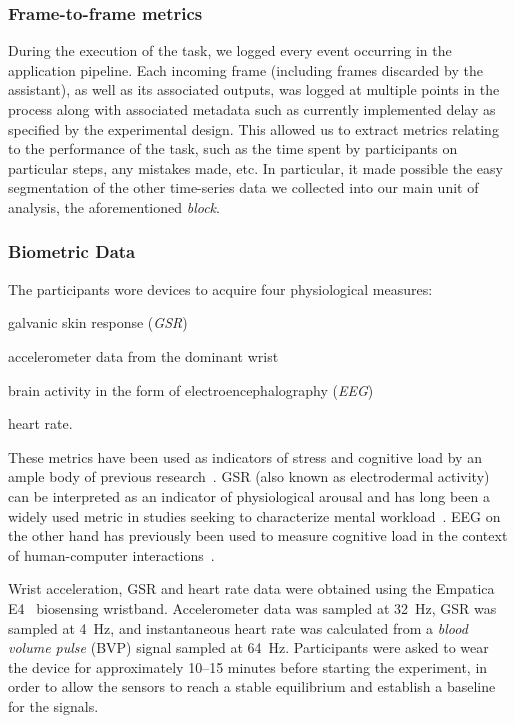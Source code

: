 \subsubsection{Frame-to-frame metrics}
During the execution of the task, we logged every event occurring in the application pipeline.
Each incoming frame (including frames discarded by the assistant), as well as its associated outputs, was logged at multiple points in the process along with associated metadata such as currently implemented delay as specified by the experimental design.
This allowed us to extract metrics relating to the performance of the task, such as the time spent by participants on particular steps, any mistakes made, etc.
In particular, it made possible the easy segmentation of the other time-series data we collected into our main unit of analysis, the aforementioned \emph{block}.

\subsubsection{Biometric Data}
The participants wore devices to acquire four physiological measures:
\begin{enumerate*}[itemjoin={{, }},
                  itemjoin*={{, and }},
                  label={{(\arabic*)}}]
  \item galvanic skin response (\emph{GSR})
  \item accelerometer data from the dominant wrist
  \item brain activity in the form of electroencephalography (\emph{EEG})
  \item heart rate.
\end{enumerate*}

These metrics have been used as indicators of stress and cognitive load by an ample body of previous research~\cite{khawadi2015:usinggsrtrust,kuikkaniemi2010:biofeedback,solovey2014:classifyingdriverworkload}.
GSR (also known as electrodermal activity) can be interpreted as an indicator of physiological arousal and has long been a widely used metric in studies seeking to characterize mental workload~\cite{peterson1907psycho,Healey2005,Son2010,khawadi2015:usinggsrtrust,kuikkaniemi2010:biofeedback,solovey2014:classifyingdriverworkload,}.
EEG on the other hand has previously been used to measure cognitive load in the context of human-computer interactions~\cite{Antonenko2010,Grimes2008,kumar2016measurement}.

Wrist acceleration, GSR and heart rate data were obtained using the Empatica E4~\cite{empatica:e4} biosensing wristband.
Accelerometer data was sampled at \SI{32}{\hertz},
GSR was sampled at \SI{4}{\hertz}, and instantaneous heart rate was calculated from a \emph{blood volume pulse} (BVP) signal sampled at \SI{64}{\hertz}.
Participants were asked to wear the device for approximately 10--15 minutes before starting the experiment, in order to allow the sensors to reach a stable equilibrium and establish a baseline for the signals.

